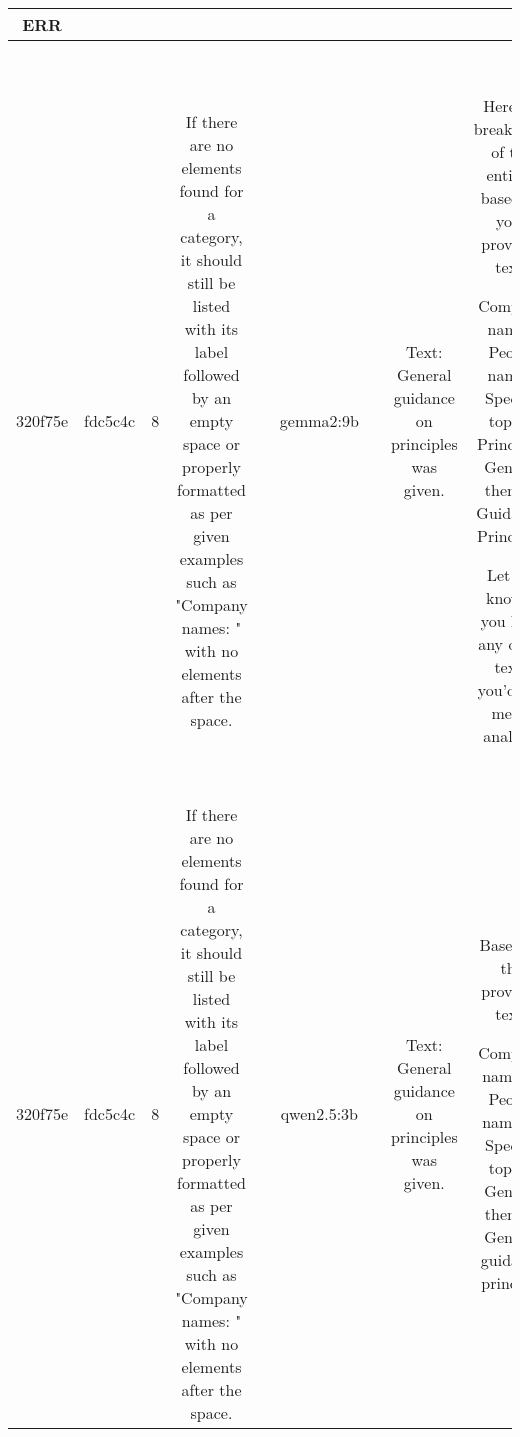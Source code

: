 \begin{table}[h!]
\begin{tabular}{|c|c|c|c|c|c|c|c|c|c|c|}
ERR\\
\hline
320f75e & fdc5c4c & 8 & If there are no elements found for a category, it should still be listed with its label followed by an empty space or properly formatted as per given examples such as "Company names: " with no elements after the space. &  & gemma2:9b &  & Text: General guidance on principles was given. & Here's a breakdown of the entities based on your provided text:

Company names:  
People names: 
Specific topics: Principles 
General themes: Guidance, Principles




Let me know if you have any other texts you'd like me to analyze! 
 & err & The output provided by the chatbot doesn't adhere fully to the required format as specified in the description. The desired format outlined asks for "<comma_separated_list_of_company_names>", "<comma_separated_list_of_people_names>", "<comma_separated_list_of_specific_topics>", and "<comma_separated_list_of_general_themes>". In the chatbot's output, for "Company names" and "People names", it is blank and should at least show empty placeholders if no entities are found. For "Specific topics", the output is given as a plain text list rather than indicating it as a comma-separated list as per the description. Similarly, for "General themes", although there is a comma separating the themes, it's not clear if it follows broad comma-separation convention since it's not in a list format.

The description also specifies presenting each category as a defined list format, which isn't precisely followed in the given response as it omits the expected format for some parts, even if empty. Also, the chatbot added an additional sentence, "Let me know if you have any other texts you'd like me to analyze!", which is not mentioned in the desired output format. This indicates a deviation as it's outside what's specified in the completion description. 

ERR\\
\hline
320f75e & fdc5c4c & 8 & If there are no elements found for a category, it should still be listed with its label followed by an empty space or properly formatted as per given examples such as "Company names: " with no elements after the space. &  & qwen2.5:3b &  & Text: General guidance on principles was given. & Based on the provided text:

Company names: 
- People names:
- Specific topics: 
General themes: General guidance principle & err & The chatbot output does not comply with the desired format specified in the description. The expected format requires a list of company names, people names, specific topics, and general themes to be clearly separated and listed after respective labels (with comma-separated list for each category). In the output provided:


\end{tabular}
\end{table}
